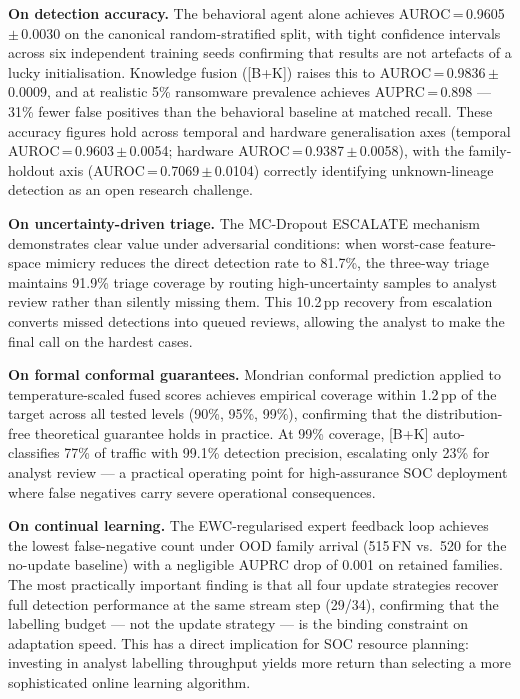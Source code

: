 \documentclass[journal]{IEEEtran}
\begin{document}
\textbf{On detection accuracy.}
The behavioral agent alone achieves AUROC\,=\,0.9605\,$\pm$\,0.0030 on the canonical
random-stratified split, with tight confidence intervals across six independent training
seeds confirming that results are not artefacts of a lucky initialisation.
Knowledge fusion ([B+K]) raises this to AUROC\,=\,0.9836\,$\pm$\,0.0009, and at realistic
5\% ransomware prevalence achieves AUPRC\,=\,0.898 --- 31\% fewer false positives than the
behavioral baseline at matched recall.
These accuracy figures hold across temporal and hardware generalisation axes (temporal
AUROC\,=\,0.9603\,$\pm$\,0.0054; hardware AUROC\,=\,0.9387\,$\pm$\,0.0058), with the
family-holdout axis (AUROC\,=\,0.7069\,$\pm$\,0.0104) correctly identifying
unknown-lineage detection as an open research challenge.

\textbf{On uncertainty-driven triage.}
The MC-Dropout ESCALATE mechanism demonstrates clear value under adversarial conditions:
when worst-case feature-space mimicry reduces the direct detection rate to 81.7\%,
the three-way triage maintains 91.9\% triage coverage by routing high-uncertainty samples
to analyst review rather than silently missing them.
This 10.2\,pp recovery from escalation converts missed detections into queued reviews,
allowing the analyst to make the final call on the hardest cases.

\textbf{On formal conformal guarantees.}
Mondrian conformal prediction applied to temperature-scaled fused scores achieves empirical
coverage within 1.2\,pp of the target across all tested levels (90\%, 95\%, 99\%),
confirming that the distribution-free theoretical guarantee holds in practice.
At 99\% coverage, [B+K] auto-classifies 77\% of traffic with 99.1\% detection precision,
escalating only 23\% for analyst review --- a practical operating point for high-assurance
SOC deployment where false negatives carry severe operational consequences.

\textbf{On continual learning.}
The EWC-regularised expert feedback loop achieves the lowest false-negative count under
OOD family arrival (515\,FN vs.\ 520 for the no-update baseline) with a negligible AUPRC
drop of 0.001 on retained families.
The most practically important finding is that all four update strategies recover full
detection performance at the same stream step (29/34), confirming that the labelling
budget --- not the update strategy --- is the binding constraint on adaptation speed.
This has a direct implication for SOC resource planning: investing in analyst labelling
throughput yields more return than selecting a more sophisticated online learning algorithm.
\end{document}
